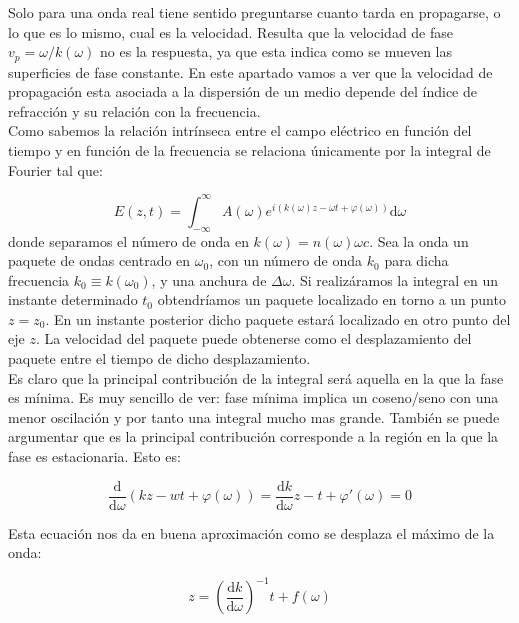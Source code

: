 \documentclass[12pt,a4paper]{article}
\newcommand{\parentesis}[1]{\left( #1  \right)}
\newcommand{\D}{\mathrm{d}}
\numberwithin{equation}{section}
\numberwithin{figure}{section}
\begin{document}
Solo para una onda real tiene sentido preguntarse cuanto tarda en propagarse, o lo que es lo mismo, cual es la velocidad. Resulta que la velocidad de fase $v_p = \omega / k(\omega)$ no es la respuesta, ya que esta indica como se mueven las superficies de fase constante. En este apartado vamos a ver que la velocidad de propagación esta asociada a la dispersión de un medio depende del índice de refracción y su relación con la frecuencia. \\

Como sabemos la relación intrínseca entre el campo eléctrico en función del tiempo y en función de  la frecuencia se relaciona únicamente por la integral de Fourier tal que:

\begin{equation}
E(z,t) = \int_{-\infty}^{\infty} A(\omega) e^{i(k(\omega)z - \omega t + \varphi (\omega))} \D \omega
\end{equation}
donde separamos el número de onda en $k(\omega) = n(\omega) \omega c$. Sea la onda un paquete de ondas centrado en $\omega_0$, con un número de onda $k_0$ para dicha frecuencia $k_0 \equiv k(\omega_0)$, y una anchura de $\Delta \omega$. Si realizáramos la integral en un instante determinado $t_0$ obtendríamos un paquete localizado en torno a un punto $z=z_0$. En un instante posterior dicho paquete estará localizado en otro punto del eje $z$. La velocidad del paquete puede obtenerse como el desplazamiento del paquete entre el tiempo de dicho desplazamiento.  \\
 
Es claro que la principal contribución de la integral será aquella en la que la fase es mínima. Es muy sencillo de ver: fase mínima implica un coseno/seno con una menor oscilación y por tanto una integral mucho mas grande. También se puede argumentar que es la principal contribución corresponde a la región en la que la fase es estacionaria. Esto es:

\begin{equation}
\dfrac{\D}{\D \omega} \parentesis{kz - wt + \varphi (\omega)} = \dfrac{\D k}{\D \omega} z - t + \varphi'(\omega) = 0
\end{equation}

Esta ecuación nos da en buena aproximación como se desplaza el máximo de la onda:

\begin{equation}
z = \parentesis{\dfrac{\D k}{\D \omega}}^{-1} t + f(\omega)
\end{equation}
\end{document}
